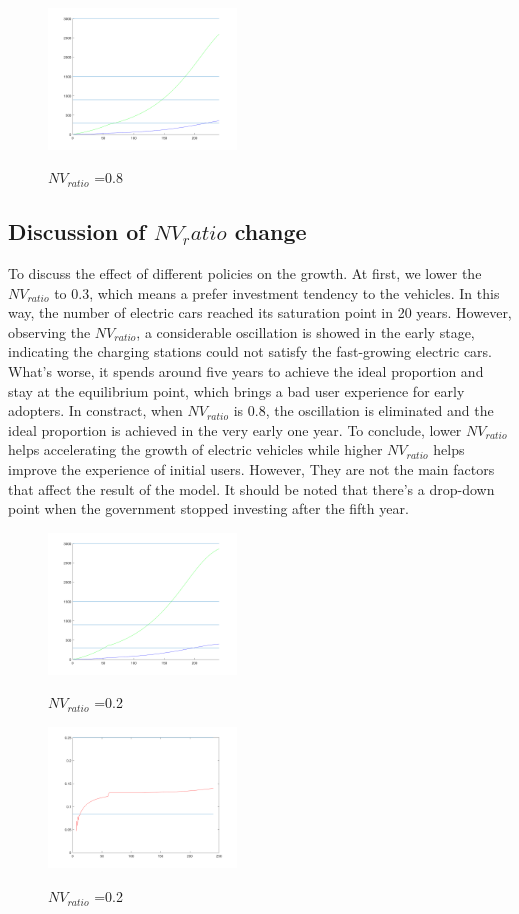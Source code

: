 \documentclass{mcmthesis}
\begin{document}
 \begin{figure}[htbp]
	\centering
	\includegraphics[width=5cm]{img/ireland08.png}\\
	\caption{$NV_{ratio}$ =0.8}
	\label{Figure7}
\end{figure}
\subsection{Discussion of $NV_ratio$ change}
To discuss the effect of different policies on the growth. At first, we lower the $NV_{ratio}$ to 0.3,  which means a prefer investment tendency to the vehicles. In this way, the number of electric cars reached its saturation point in 20 years. However, observing the $NV_{ratio}$, a considerable oscillation is showed in the early stage, indicating the charging stations could not satisfy the fast-growing electric cars. What's worse, it spends around five years to achieve the ideal proportion and stay at the equilibrium point, which brings a bad user experience for early adopters. In constract, when $NV_{ratio}$ is 0.8, the oscillation is eliminated and the ideal proportion is achieved in the very early one year. To conclude, lower $NV_{ratio}$ helps accelerating the growth of electric vehicles while higher $NV_{ratio}$ helps improve the experience of initial users. However, They are not the main factors that affect the result of the model. It should be noted that there's a drop-down point when the government stopped investing after the fifth year.
\begin{figure}[htbp]
	\centering
	\includegraphics[width=5cm]{img/ireland02.png}\\
	\caption{$NV_{ratio}$ =0.2}
	\label{Figure7}
\end{figure}
\begin{figure}[htbp]
	\centering
	\includegraphics[width=5cm]{img/ireland02ver.png}\\
	\caption{$NV_{ratio}$ =0.2}
	\label{Figure7}
\end{figure}
\end{document}
